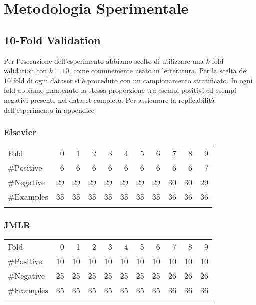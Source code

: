 \section{Metodologia Sperimentale}


\subsection{10-Fold Validation}

Per l'esecuzione dell'esperimento abbiamo scelto di utilizzare una $k$-fold validation con $k=10$, come comunemente usato in letteratura.
Per la scelta dei $10$ fold di ogni dataset si è proceduto con un campionamento stratificato. In ogni fold abbiamo mantenuto la stessa proporzione tra esempi positivi ed esempi negativi presente nel dataset completo.
Per assicurare la replicabilità dell'esperimento in appendice



\subsubsection{Elsevier}

\begin{table}[htbp]
	\centering
		\begin{tabular}{l@{\qquad}*{10}{r}}
		\toprule
\addlinespace
			Fold &  0 &  1 &  2 &  3 &  4 &  5 &  6 &  7 &  8 &  9 \\
\addlinespace
\midrule
\addlinespace
\#Positive  & 6  & 6  &  6 &  6 &  6 &  6 &  6 &  6 &  6 &  7 \\
\#Negative  & 29 & 29 & 29 & 29 & 29 & 29 & 29 & 30 & 30 & 29 \\
\#Examples & 35 & 35 & 35 & 35 & 35 & 35 & 35 & 36 & 36 & 36 \\
\addlinespace
\bottomrule
		\end{tabular}
	\label{tab:Elsevier}
\end{table}


\subsubsection{JMLR}

\begin{table}
\centering
\begin{tabular}{l@{\qquad}*{10}{r}}
		\toprule
\addlinespace
Fold &  0 &  1 &  2 &  3 &  4 &  5 &  6 &  7 &  8 &  9 \\
\addlinespace
\midrule
\addlinespace
\#Positive  & 10  & 10  &  10 &  10 &  10 &  10 &  10 &  10 &  10 &  10 \\
\#Negative  & 25 & 25 & 25 & 25 & 25 & 25 & 25 & 26 & 26 & 26 \\
\#Examples  & 35 & 35 & 35 & 35 & 35 & 35 & 35 & 36 & 36 & 36 \\
\addlinespace
\bottomrule
\end{tabular}
	\label{tab:JMLR}
\end{table}



